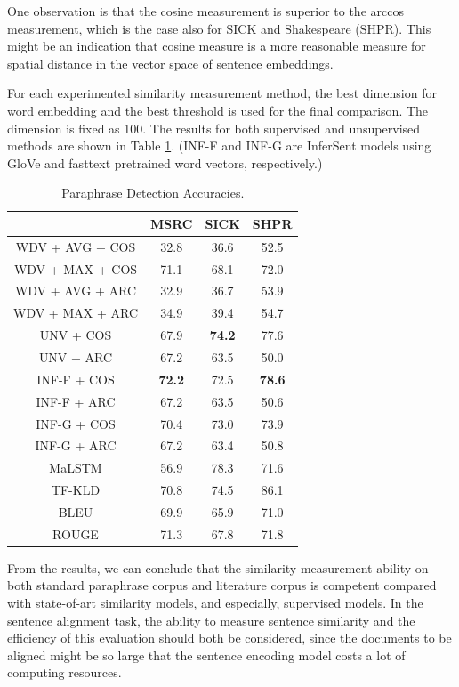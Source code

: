 One observation is that the cosine measurement is superior to the arccos measurement, which is the case also for SICK and Shakespeare (SHPR). This might be an indication that cosine measure is a more reasonable measure for spatial distance in the vector space of sentence embeddings.

For each experimented similarity measurement method, the best dimension for word embedding and the best threshold is used for the final comparison. The dimension is fixed as 100. The results for both supervised and unsupervised methods are shown in Table \ref{tb:2}. (INF-F and INF-G are InferSent models using GloVe and fasttext pretrained word vectors, respectively.)

\begin{table}[h!]\footnotesize
	\centering
	\small
	\begin{tabular}{|c|c|c|c|}
		\hline
		\diagbox{Method}{Accuracy (\%)}{Corpus} & MSRC & SICK & SHPR \\
		\hline
		\hline
		WDV + AVG + COS & 32.8 & 36.6 & 52.5 \\
		WDV + MAX + COS & 71.1 & 68.1 & 72.0 \\
		WDV + AVG + ARC & 32.9 & 36.7 & 53.9 \\
		WDV + MAX + ARC & 34.9 & 39.4 & 54.7 \\
		UNV + COS & 67.9 & \textbf{74.2} & 77.6 \\
		UNV + ARC & 67.2 & 63.5 & 50.0 \\
		INF-F + COS & \textbf{72.2} & 72.5 & \textbf{78.6} \\
		INF-F + ARC & 67.2 & 63.5 & 50.6 \\
		INF-G + COS & 70.4 & 73.0 & 73.9 \\
		INF-G + ARC & 67.2 & 63.4 & 50.8 \\
		\hline
		MaLSTM & 56.9 & 78.3 & 71.6 \\
		TF-KLD & 70.8 & 74.5 & 86.1 \\
		\hline
		BLEU & 69.9 & 65.9 & 71.0 \\
		ROUGE & 71.3 & 67.8 & 71.8 \\
		\hline
	\end{tabular}
	\caption{Paraphrase Detection Accuracies.}\label{tb:2}
\end{table}

From the results, we can conclude that the similarity measurement ability on both standard paraphrase corpus and literature corpus is competent compared with state-of-art similarity models, and especially, supervised models. In the sentence alignment task, the ability to measure sentence similarity and the efficiency of this evaluation should both be considered, since the documents to be aligned might be so large that the sentence encoding model costs a lot of computing resources.

